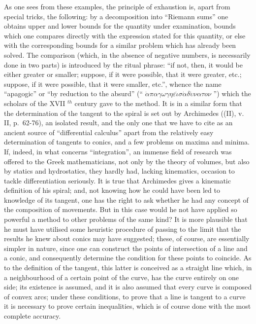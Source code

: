 As one sees from these examples, the principle of exhaustion is, apart from special tricks, the following: by a decomposition into ``Riemann sums'' one obtains upper and lower bounds for the quantity under examination, bounds which one compares directly with the expression stated for this quantity, or else with the corresponding bounds for a similar problem which has already been solved. The comparison (which, in the absence of negative numbers, is necessarily done in two parts) is introduced by the ritual phrase: ``if not, then, it would be either greater or smaller; suppose, if it were possible, that it were greater, etc.; suppose, if it were possible, that it were smaller, etc.'', whence the name ``apagogic'' or ``by reduction to the absurd'' (`` \(\dot{\alpha}\pi\alpha\gamma\omega\gamma\eta \varepsilon\dot{\iota}\sigma \dot{\alpha}\delta\acute{\upsilon}\nu\alpha\tau o\nu\) '') which the scholars of the XVII \(^{th}\) century gave to the method. It is in a similar form that the determination of the tangent to the spiral is set out by Archimedes ((II), v. II, p.~62-76), an isolated result, and the only one that we have to cite as an ancient source of ``differential calculus'' apart from the relatively easy determination of tangents to conics, and a few problems on maxima and minima. If, indeed, in what concerns ``integration'', an immense field of research was offered to the Greek mathematicians, not only by the theory of volumes, but also by statics and hydrostatics, they hardly had, lacking kinematics, occasion to tackle differentiation seriously. It is true that Archimedes gives a kinematic definition of his spiral; and, not knowing how he could have been led to knowledge of its tangent, one has the right to ask whether he had any concept of the composition of movements. But in this case would he not have applied so powerful a method to other problems of the same kind? It is more plausible that he must have utilised some heuristic procedure of passing to the limit that the results he knew about conics may have suggested; these, of course, are essentially simpler in nature, since one can construct the points of intersection of a line and a conic, and consequently determine the condition for these points to coincide. As to the definition of the tangent, this latter is conceived as a straight line which, in a neighbourhood of a certain point of the curve, has the curve entirely on one side; its existence is assumed, and it is also assumed that every curve is composed of convex arcs; under these conditions, to prove that a line is tangent to a curve it is necessary to prove certain inequalities, which is of course done with the most complete accuracy.

